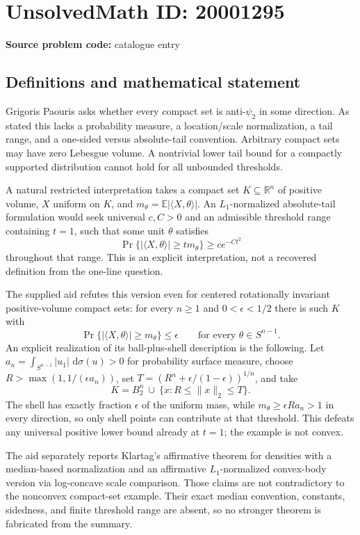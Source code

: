 \documentclass[11pt]{article}
\newcommand{\R}{\mathbb{R}}
\newcommand{\E}{\mathbb{E}}
\newcommand{\dd}{\,\mathrm{d}}
\begin{document}
\section*{UnsolvedMath ID: 20001295}
\textbf{Source problem code:} catalogue entry
\subsection{Definitions and mathematical statement}
Grigoris Paouris asks whether every compact set is anti-$\psi_2$ in some direction. As stated this lacks a probability measure, a location/scale normalization, a tail range, and a one-sided versus absolute-tail convention. Arbitrary compact sets may have zero Lebesgue volume. A nontrivial lower tail bound for a compactly supported distribution cannot hold for all unbounded thresholds.

A natural restricted interpretation takes a compact set $K\subseteq\R^n$ of positive volume, $X$ uniform on $K$, and $m_\theta=\E|\langle X,\theta\rangle|$. An $L_1$-normalized absolute-tail formulation would seek universal $c,C>0$ and an admissible threshold range containing $t=1$, such that some unit $\theta$ satisfies
\[
 \Pr\{|\langle X,\theta\rangle|\geq t m_\theta\}\geq c e^{-Ct^2}
\]
throughout that range. This is an explicit interpretation, not a recovered definition from the one-line question.

The supplied aid refutes this version even for centered rotationally invariant positive-volume compact sets: for every $n\geq1$ and $0<\epsilon<1/2$ there is such $K$ with
\[
 \Pr\{|\langle X,\theta\rangle|\geq m_\theta\}\leq\epsilon
 \qquad\text{for every }\theta\in S^{n-1}.
\]
An explicit realization of its ball-plus-shell description is the following. Let $a_n=\int_{S^{n-1}}|u_1|\,\dd\sigma(u)>0$ for probability surface measure, choose $R>\max(1,1/(\epsilon a_n))$, set $T=(R^n+\epsilon/(1-\epsilon))^{1/n}$, and take
\[
 K=B_2^n\ \cup\ \{x:R\leq\|x\|_2\leq T\}.
\]
The shell has exactly fraction $\epsilon$ of the uniform mass, while $m_\theta\geq\epsilon R a_n>1$ in every direction, so only shell points can contribute at that threshold. This defeats any universal positive lower bound already at $t=1$; the example is not convex.

The aid separately reports Klartag's affirmative theorem for densities with a median-based normalization and an affirmative $L_1$-normalized convex-body version via log-concave scale comparison. Those claims are not contradictory to the nonconvex compact-set example. Their exact median convention, constants, sidedness, and finite threshold range are absent, so no stronger theorem is fabricated from the summary.
\end{document}
